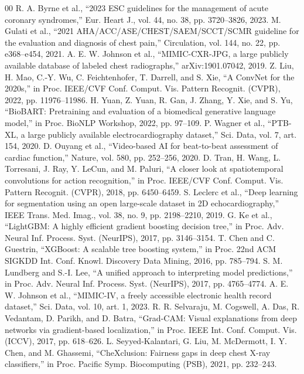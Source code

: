 \documentclass[conference,a4paper]{IEEEtran}
\begin{document}
\begin{thebibliography}{00}
 R. A. Byrne et al., ``2023 ESC guidelines for the management of acute coronary syndromes,'' Eur. Heart J., vol. 44, no. 38, pp. 3720--3826, 2023.
 M. Gulati et al., ``2021 AHA/ACC/ASE/CHEST/SAEM/SCCT/SCMR guideline for the evaluation and diagnosis of chest pain,'' Circulation, vol. 144, no. 22, pp. e368--e454, 2021.
 A. E. W. Johnson et al., ``MIMIC-CXR-JPG, a large publicly available database of labeled chest radiographs,'' arXiv:1901.07042, 2019.
 Z. Liu, H. Mao, C.-Y. Wu, C. Feichtenhofer, T. Darrell, and S. Xie, ``A ConvNet for the 2020s,'' in Proc. IEEE/CVF Conf. Comput. Vis. Pattern Recognit. (CVPR), 2022, pp. 11976--11986.
 H. Yuan, Z. Yuan, R. Gan, J. Zhang, Y. Xie, and S. Yu, ``BioBART: Pretraining and evaluation of a biomedical generative language model,'' in Proc. BioNLP Workshop, 2022, pp. 97--109.
 P. Wagner et al., ``PTB-XL, a large publicly available electrocardiography dataset,'' Sci. Data, vol. 7, art. 154, 2020.
 D. Ouyang et al., ``Video-based AI for beat-to-beat assessment of cardiac function,'' Nature, vol. 580, pp. 252--256, 2020.
 D. Tran, H. Wang, L. Torresani, J. Ray, Y. LeCun, and M. Paluri, ``A closer look at spatiotemporal convolutions for action recognition,'' in Proc. IEEE/CVF Conf. Comput. Vis. Pattern Recognit. (CVPR), 2018, pp. 6450--6459.
 S. Leclerc et al., ``Deep learning for segmentation using an open large-scale dataset in 2D echocardiography,'' IEEE Trans. Med. Imag., vol. 38, no. 9, pp. 2198--2210, 2019.
 G. Ke et al., ``LightGBM: A highly efficient gradient boosting decision tree,'' in Proc. Adv. Neural Inf. Process. Syst. (NeurIPS), 2017, pp. 3146--3154.
 T. Chen and C. Guestrin, ``XGBoost: A scalable tree boosting system,'' in Proc. 22nd ACM SIGKDD Int. Conf. Knowl. Discovery Data Mining, 2016, pp. 785--794.
 S. M. Lundberg and S.-I. Lee, ``A unified approach to interpreting model predictions,'' in Proc. Adv. Neural Inf. Process. Syst. (NeurIPS), 2017, pp. 4765--4774.
 A. E. W. Johnson et al., ``MIMIC-IV, a freely accessible electronic health record dataset,'' Sci. Data, vol. 10, art. 1, 2023.
 R. R. Selvaraju, M. Cogswell, A. Das, R. Vedantam, D. Parikh, and D. Batra, ``Grad-CAM: Visual explanations from deep networks via gradient-based localization,'' in Proc. IEEE Int. Conf. Comput. Vis. (ICCV), 2017, pp. 618--626.
 L. Seyyed-Kalantari, G. Liu, M. McDermott, I. Y. Chen, and M. Ghassemi, ``CheXclusion: Fairness gaps in deep chest X-ray classifiers,'' in Proc. Pacific Symp. Biocomputing (PSB), 2021, pp. 232--243.

\end{thebibliography}
\end{document}
